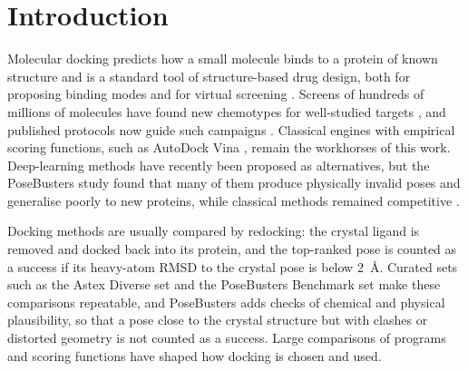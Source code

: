\section{Introduction}
\label{sec:introduction}


Molecular docking predicts how a small molecule binds to a protein of known structure and
is a standard tool of structure-based drug design, both for proposing binding modes and for
virtual screening \citep{kitchen2004docking,irwin2016docking}. Screens of hundreds of
millions of molecules have found new chemotypes for well-studied targets
\citep{lyu2019ultralarge}, and published protocols now guide such campaigns
\citep{bender2021practical}. Classical engines with empirical scoring functions, such as
AutoDock Vina \citep{trott2010vina,eberhardt2021vina}, remain the workhorses of this work.
Deep-learning methods have recently been proposed as alternatives, but the PoseBusters study
found that many of them produce physically invalid poses and generalise poorly to new
proteins, while classical methods remained competitive \citep{buttenschoen2024posebusters}.

Docking methods are usually compared by redocking: the crystal ligand is removed and docked
back into its protein, and the top-ranked pose is counted as a success if its heavy-atom
RMSD to the crystal pose is below \SI{2}{\angstrom}. Curated sets such as the Astex Diverse
set \citep{hartshorn2007astex} and the PoseBusters Benchmark set
\citep{buttenschoen2024posebusters} make these comparisons repeatable, and PoseBusters adds
checks of chemical and physical plausibility, so that a pose close to the crystal structure
but with clashes or distorted geometry is not counted as a success. Large comparisons of
programs and scoring functions \citep{warren2006critical} have shaped how docking is chosen
and used.

